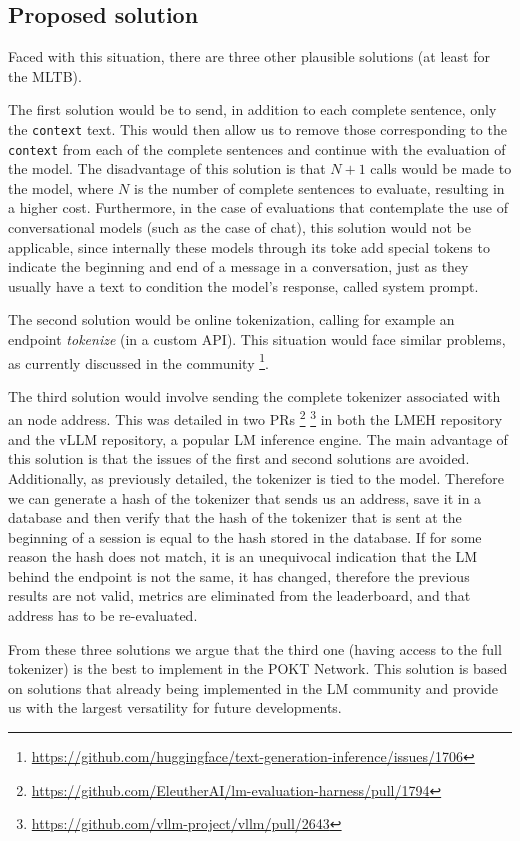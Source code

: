 \subsection{Proposed solution}\label{subsec:b3}

Faced with this situation, there are three other plausible solutions (at least for the \gls{MLTB}). 

The first solution would be to send, in addition to each complete sentence, only the \texttt{context} text. 
This would then allow us to remove those corresponding to the \texttt{context} from each of the complete sentences and continue with the evaluation of the model. 
The disadvantage of this solution is that $N+1$ calls would be made to the model, where $N$ is the number of complete sentences to evaluate, resulting in a higher cost. 
Furthermore, in the case of evaluations that contemplate the use of conversational models (such as the case of chat), this solution would not be applicable, since internally these models through its toke add special tokens to indicate the beginning and end of a message in a conversation, just as they usually have a text to condition the model's response, called system prompt. 

The second solution would be online tokenization, calling for example an endpoint \emph{tokenize} (in a custom \gls{API}). 
This situation would face similar problems, as currently discussed in the community \footnote{\url{https://github.com/huggingface/text-generation-inference/issues/1706}}. 

The third solution would involve sending the complete tokenizer associated with an node address. 
This was detailed in two PRs \footnote{\url{https://github.com/EleutherAI/lm-evaluation-harness/pull/1794}} \footnote{\url{https://github.com/vllm-project/vllm/pull/2643}} in both the \gls{LMEH} repository and the vLLM repository, a popular \gls{LM} inference engine. 
The main advantage of this solution is that the issues of the first and second solutions are avoided. 
Additionally, as previously detailed, the tokenizer is tied to the model. 
Therefore we can generate a hash of the tokenizer that sends us an address, save it in a database and then verify that the hash of the tokenizer that is sent at the beginning of a session is equal to the hash stored in the database. 
If for some reason the hash does not match, it is an unequivocal indication that the \gls{LM} behind the endpoint is not the same, it has changed, therefore the previous results are not valid, metrics are eliminated from the leaderboard, and that address has to be re-evaluated. 

From these three solutions we argue that the third one (having access to the full tokenizer) is the best to implement in the POKT Network. This solution is based on solutions that already being implemented in the \gls{LM} community and provide us with the largest versatility for future developments.